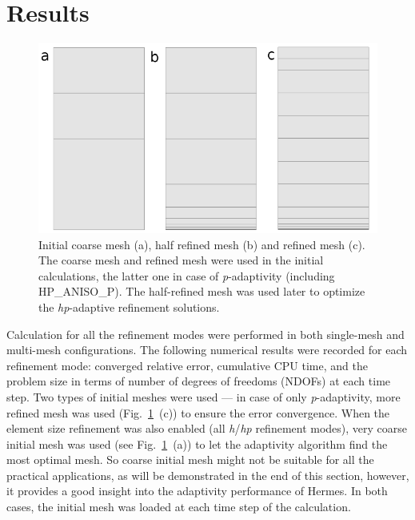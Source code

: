 \section{Results}

\begin{figure}
  \begin{centering}
  \includegraphics[width=.8\columnwidth]{mesh}
  \caption{\label{fig:mesh} Initial coarse mesh (a),
  	half refined mesh (b) and refined mesh (c). The coarse mesh
	and refined mesh were used in the initial calculations, the latter one
	in case of \emph{p}-adaptivity (including HP\_ANISO\_P). The half-refined mesh was
	used later to optimize the \emph{hp}-adaptive refinement solutions.}
  \end{centering}
\end{figure}
Calculation for all the refinement modes were performed
in both single-mesh and multi-mesh configurations. 
The following numerical results were recorded for each 
refinement mode: converged relative error, cumulative CPU
time, and the problem size in terms of number
of degrees of freedoms (NDOFs) at each time step. 
Two types of initial meshes were used --- in case of only \emph{p}-adaptivity,
more refined mesh was used (Fig.~\ref{fig:mesh}~(c)) to ensure
the error convergence.
When the element size refinement
was also enabled (all \emph{h}/\emph{hp} refinement modes), very coarse initial mesh
was used (see Fig.~\ref{fig:mesh}~(a)) to let the adaptivity
algorithm find the most optimal mesh. So coarse initial mesh might not be
suitable for all the practical applications, as will be demonstrated in the
end of this section, however, it provides a good insight into the
adaptivity performance of Hermes.
In both cases, the initial mesh was loaded at each time step of the
calculation.

